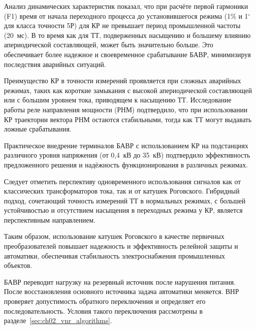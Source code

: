 Анализ динамических характеристик показал, что при расчёте первой гармоники (F1) время от начала переходного процесса до установившегося режима (1\% и 1$^\circ$ для класса точности 5Р) для КР не превышает период промышленной частоты (20~мс). В то время как для ТТ, подверженных насыщению и большему влиянию апериодической составляющей, может быть значительно больше. Это обеспечивает более надежное и своевременное срабатывание БАВР, минимизируя последствия аварийных ситуаций.

Преимущество КР в точности измерений проявляется при сложных аварийных режимах, таких
как короткие замыкания с высокой апериодической составляющей или с большим уровнем тока,
приводящем к насыщению ТТ. Исследование работы реле направления мощности (РНМ)
подтвердило, что при использовании КР траектории вектора РНМ остаются стабильными, тогда
как ТТ могут выдавать ложные срабатывания.

Практическое внедрение терминалов БАВР с использованием КР на подстанциях различного
уровня напряжения (от 0,4~кВ до 35~кВ) подтвердило эффективность предложенного решения и
надёжность функционирования в различных режимах.

Следует отметить перспективу одновременного использования сигналов как от классических
трансформаторов тока, так и от катушек Роговского. Гибридный подход, сочетающий точность
измерений ТТ в нормальных режимах, с большей устойчивостью и отсутствием насыщения в
переходных режима у КР, является перспективным направлением.

Таким образом, использование катушек Роговского в качестве первичных преобразователей повышает надежность и эффективность релейной защиты и автоматики, обеспечивая стабильность электроснабжения промышленных объектов.

БАВР переводит нагрузку на резервный источник после нарушения питания. После
восстановления основного источника задача автоматики меняется. ВНР проверяет
допустимость обратного переключения и определяет его последовательность. Условия такого
переключения рассмотрены в разделе~\ref{sec:ch02_vnr_algorithms}.

